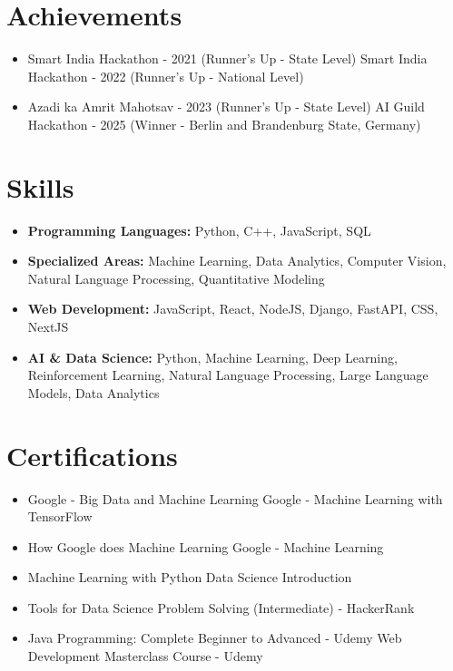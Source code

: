\documentclass[a4paper,10pt]{article}
\begin{document}
\section*{Achievements}
\begin{itemize}
\item Smart India Hackathon - 2021 (Runner's Up - State Level) \hfill Smart India Hackathon - 2022 (Runner's Up - National Level)
\item Azadi ka Amrit Mahotsav - 2023 (Runner's Up - State Level) \hfill AI Guild Hackathon - 2025 (Winner - Berlin and Brandenburg State, Germany)
\end{itemize}

\section*{Skills}
\begin{itemize}
  \item \textbf{Programming Languages:} Python, C++, JavaScript, SQL
  \item \textbf{Specialized Areas:} Machine Learning, Data Analytics, Computer Vision, Natural Language Processing, Quantitative Modeling
  \item \textbf{Web Development:} JavaScript, React, NodeJS, Django, FastAPI, CSS, NextJS
  \item \textbf{AI \& Data Science:} Python, Machine Learning, Deep Learning, Reinforcement Learning, Natural Language Processing, Large Language Models, Data Analytics
\end{itemize}

\section*{Certifications}
\begin{itemize}
\item Google - Big Data and Machine Learning \hfill Google - Machine Learning with TensorFlow
\item How Google does Machine Learning \hfill Google - Machine Learning
\item Machine Learning with Python \hfill Data Science Introduction
\item Tools for Data Science \hfill Problem Solving (Intermediate) - HackerRank
\item Java Programming: Complete Beginner to Advanced - Udemy \hfill Web Development Masterclass Course - Udemy
\end{itemize}
\end{document}
